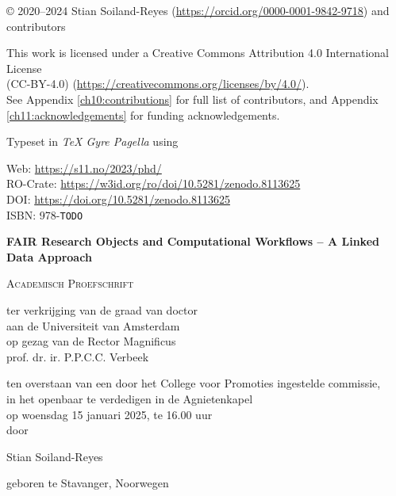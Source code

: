 \newpage

\vspace*{\fill}

© 2020--2024 Stian Soiland-Reyes 
(\url{https://orcid.org/0000-0001-9842-9718})
and contributors

This work is licensed under a Creative Commons Attribution 4.0 International License \\
(CC-BY-4.0) (\url{https://creativecommons.org/licenses/by/4.0/}).\\
See Appendix \ref{ch10:contributions} for full list of contributors, and Appendix \ref{ch11:acknowledgements} for funding acknowledgements.


Typeset in \emph{TeX Gyre Pagella} using \mybanner

Web: \url{https://s11.no/2023/phd/} \\
RO-Crate: \url{https://w3id.org/ro/doi/10.5281/zenodo.8113625}\\
DOI: \url{https://doi.org/10.5281/zenodo.8113625}\\
ISBN: 978-\texttt{TODO}

\newpage
\thispagestyle{empty} 

\begin{center}

    
\Huge
\textbf{FAIR Research Objects and Computational Workflows – A Linked Data Approach}
     
\vspace*{\fill}

\LARGE
\textsc{Academisch Proefschrift}

\vspace*{\fill}

\large
{ \itshape

ter verkrijging van de graad van doctor\\
aan de Universiteit van Amsterdam\\
op gezag van de Rector Magnificus\\
prof. dr. ir. P.P.C.C. Verbeek

ten overstaan van een door het College voor Promoties ingestelde commissie,\\
in het openbaar te verdedigen in de Agnietenkapel\\
op woensdag 15 januari 2025, te 16.00 uur\\


door 
}

\vspace*{\fill}

\LARGE
Stian Soiland-Reyes

\large
geboren te Stavanger, Noorwegen 

\end{center}

